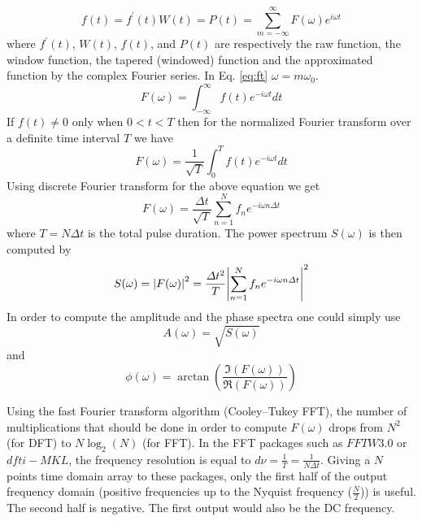 \documentclass[aps,pra,shortbibliography,onecolumn,showpacs,superscriptaddress]{revtex4-1}
\begin{document}
	
	\begin{equation}
		\label{eq:ft}
		f(t)=f^\prime(t)W(t)=P(t)=\displaystyle\sum_{m=-\infty}^{\infty}{F(\omega)e^{i\omega{t}}}
	\end{equation} 
	where $f^\prime(t)$, $W(t)$, $f(t)$, and $P(t)$ are respectively the raw function, the window 
	function, the tapered (windowed) function and the approximated function by the complex 
	Fourier series.  In Eq. \eqref{eq:ft} $\omega=m\omega_0$.
	\begin{equation}
		\label{eq:Fw}
		F(\omega)=\int_{-\infty}^{\infty}{f(t)e^{-i\omega{t}}dt} 
	\end{equation} 
	If $f(t)\neq 0$ only when $0 <t<T$ then for the normalized Fourier transform over a definite 
	time interval $T$ we have 
	\begin{equation}
		\label{eq:FwT}
		F(\omega)=\frac{1}{\sqrt{T}}\int_{0}^{T}{f(t)e^{-i\omega{t}}dt}
	\end{equation} 
	Using discrete Fourier transform for the above equation we get
	\begin{equation}
		\label{eq:DFT}
		F(\omega)=\frac{\Delta{t}}{\sqrt{T}}\displaystyle\sum_{n=1}^{N}{f_n e^{-i\omega 
		{n}{\Delta{t}}}}
	\end{equation} 
	where $T=N\Delta{t}$ is the total pulse duration. The power spectrum $S(\omega)$ is then 
	computed by
	\begin{equation}
		\label{eq:Sw}
		S(\omega)=\abs{F(\omega)}^2=\frac{\Delta{t}^2}{T}\abs{\displaystyle\sum_{n=1}^{N}{f_n 
		e^{-i\omega {n}{\Delta{t}}}}}^2
	\end{equation} 
	In order to compute the amplitude and the phase spectra one could simply use
	\begin{equation}
		\label{eq:Aw}
		A(\omega)=\sqrt{S(\omega)}
	\end{equation} 
	and 
	\begin{equation}
		\label{eq:Phiw}
		\phi(\omega)=\arctan(\frac{\Im(F(\omega))}{\Re(F(\omega))})
	\end{equation} 
	
	Using the fast Fourier transform algorithm (Cooley–Tukey FFT),  the number of multiplications 
	that should be done in order to compute $F(\omega)$ drops from $N^2$ (for DFT) to 
	$N\log_2(N)$ (for FFT). In the FFT packages such as $FFTW3.0$ or $dfti-MKL$, the frequency 
	resolution is equal to $d\nu=\frac{1}{T}=\frac{1}{N\Delta{t}}$.
	Giving a $N$ points time domain array to these packages, only the first half of the output 
	frequency domain (positive frequencies up to the Nyquist frequency ($\frac{N}{2}$)) is useful. 
	The second half is negative. The first 
	output would also be the DC frequency.  \par
	
\end{document}
